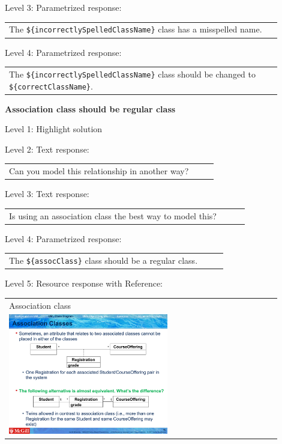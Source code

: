 \noindent Level 3: Parametrized response: \medskip

\begin{tabular}{|p{0.9\linewidth}}
The \verb|${incorrectlySpelledClassName}| class has a misspelled name.
\end{tabular} \medskip

\noindent Level 4: Parametrized response: \medskip

\begin{tabular}{|p{0.9\linewidth}}
The \verb|${incorrectlySpelledClassName}| class should be changed to \verb|${correctClassName}|.
\end{tabular} \medskip


\noindent \textbf{Association class should be regular class} \medskip

\noindent Level 1: Highlight solution \medskip

\noindent Level 2: Text response: \medskip

\begin{tabular}{|p{0.9\linewidth}}
Can you model this relationship in another way?
\end{tabular} \medskip

\noindent Level 3: Text response: \medskip

\begin{tabular}{|p{0.9\linewidth}}
Is using an association class the best way to model this?
\end{tabular} \medskip

\noindent Level 4: Parametrized response: \medskip

\begin{tabular}{|p{0.9\linewidth}}
The \verb|${assocClass}| class should be a regular class.
\end{tabular} \medskip

\noindent Level 5: Resource response with Reference: \medskip

\begin{tabular}{|p{0.9\linewidth}}
Association class

\\
\includegraphics[width=0.6\textwidth]{images/association_class.png}
\end{tabular} \medskip



